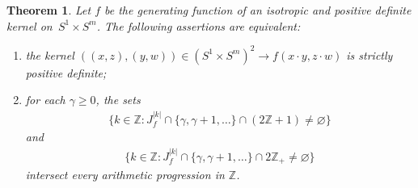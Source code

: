 \documentclass[11pt]{article}
\numberwithin{equation}{section}
\newtheorem{Theorem}{Theorem}[section]
\begin{document}
\begin{Theorem}
Let $f$ be the generating function of an isotropic and positive definite kernel on~\mbox{$S^1 \times S^m$}. The following assertions are equivalent:
\begin{enumerate}\itemsep=0pt
\item[$(i)$] the kernel $((x,z), (y,w)) \in (S^1 \times S^m)^2 \to f(x \cdot y, z \cdot w)$ is strictly positive definite;
\item[$(ii)$] for each $\gamma \geq 0$, the sets
\begin{gather*}\big\{k\in \mathbb{Z}\colon J_f^{|k|} \cap \{\gamma,\gamma+1,\ldots\}\cap (2\mathbb{Z}+1)\neq \varnothing\big\}\end{gather*}
and
\begin{gather*}\big\{k\in \mathbb{Z}\colon J_f^{|k|} \cap \{\gamma,\gamma+1,\ldots\}\cap 2\mathbb{Z}_+\neq \varnothing\big\} \end{gather*}
intersect every arithmetic progression in $\mathbb{Z}$.
\end{enumerate}
\end{Theorem}
\end{document}
